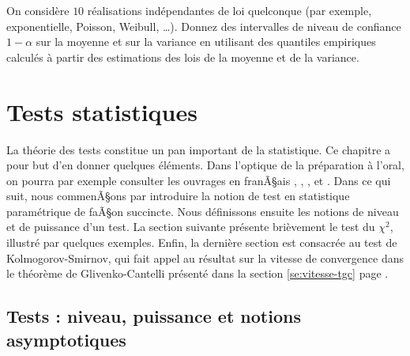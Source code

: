 \begin{exo}
  On considère $10$ réalisations indépendantes de loi quelconque (par exemple,
  exponentielle, Poisson, Weibull, \ldots). Donnez des intervalles de niveau
  de confiance $1-\alpha$ sur la moyenne et sur la variance en utilisant des
  quantiles empiriques calculés à partir des estimations des lois de la
  moyenne et de la variance.
\end{exo}

%
\section{Tests statistiques}\label{se:tests}
%


La théorie des tests constitue un pan important de la statistique. Ce chapitre
a pour but d'en donner quelques éléments. Dans l'optique de la préparation à
l'oral, on pourra par exemple consulter les ouvrages en franÃ§ais \cite{vokac},
\cite{dacunha-castelle-duflo}, \cite{paul-toulouse}, \cite{saporta} et
\cite{tomassone}. Dans ce qui suit, nous commenÃ§ons par introduire la notion
de test en statistique paramétrique de faÃ§on succincte. Nous définissons
ensuite les notions de niveau et de puissance d'un test. La section suivante
présente brièvement le test du $\chi^2$, illustré par quelques exemples.
Enfin, la dernière section est consacrée au test de Kolmogorov-Smirnov, qui
fait appel au résultat sur la vitesse de convergence dans le théorème de
Glivenko-Cantelli présenté dans la section \ref{se:vitesse-tgc} page
\pageref{se:vitesse-tgc}.

%
\subsection{Tests : niveau, puissance et notions asymptotiques}
%

